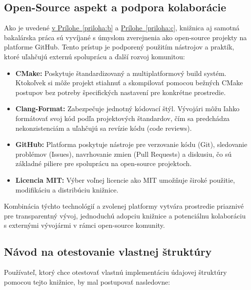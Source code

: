 \documentclass[11pt]{article}
\begin{document}
\subsection{Open-Source aspekt a podpora kolaborácie}

Ako je uvedené \hyperref[priloha:b]{v Prílohe~\ref*{priloha:b}} a \hyperref[priloha:c]{Prílohe~\ref*{priloha:c}}, knižnica aj samotná bakalárska práca sú vyvíjané s úmyslom zverejnenia ako open-source projekty na platforme GitHub. Tento prístup je podporený použitím nástrojov a praktík, ktoré uľahčujú externú spoluprácu a ďalší rozvoj komunitou:

\begin{itemize}
  \item \textbf{CMake:} Poskytuje štandardizovaný a multiplatformový build systém. Ktokoľvek si môže projekt stiahnuť a skompilovať pomocou bežných CMake postupov bez potreby špecifických nastavení pre konkrétne prostredie.
  \item \textbf{Clang-Format:} Zabezpečuje jednotný kódovací štýl. Vývojári môžu ľahko formátovať svoj kód podľa projektových štandardov, čím sa predchádza nekonzistenciám a uľahčujú sa revízie kódu (code reviews).
  \item \textbf{GitHub:} Platforma poskytuje nástroje pre verzovanie kódu (Git), sledovanie problémov (Issues), navrhovanie zmien (Pull Requests) a diskusiu, čo sú základné piliere pre spoluprácu na open-source projektoch.
  \item \textbf{Licencia MIT:} Výber voľnej licencie ako MIT umožňuje široké použitie, modifikáciu a distribúciu knižnice.
\end{itemize}

Kombinácia týchto technológií a zvolenej platformy vytvára prostredie priaznivé pre transparentný vývoj, jednoduchú adopciu knižnice a potenciálnu kolaboráciu s externými vývojármi v rámci open-source komunity.

\subsection{Návod na otestovanie vlastnej štruktúry}

Používateľ, ktorý chce otestovať vlastnú implementáciu údajovej štruktúry pomocou tejto knižnice, by mal postupovať nasledovne:
\end{document}
